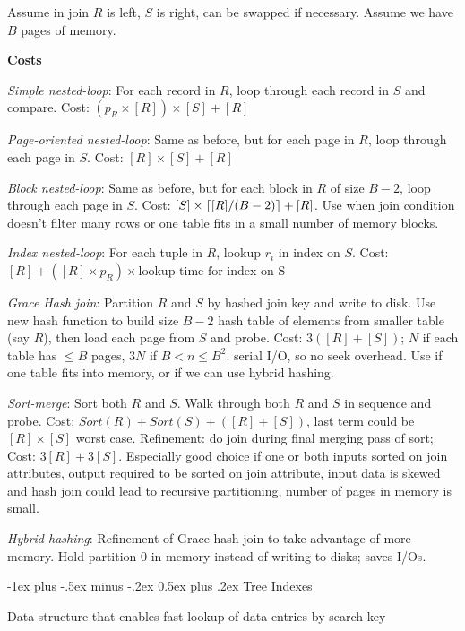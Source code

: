 \documentclass[10pt,landscape]{article}
\makeatletter
\DeclarePairedDelimiter{\ceil}{\lceil}{\rceil}
\renewcommand{\section}{\@startsection{section}{1}{0mm}%
                                {-1ex plus -.5ex minus -.2ex}%
                                {0.5ex plus .2ex}%
                                {\normalfont\large\bfseries}}
\makeatother
\begin{document}
\begin{multicols}{3}
Assume in join $R$ is left, $S$ is right, can be swapped if necessary. Assume we have $B$ pages of memory.

\textbf{Costs}

\textit{Simple nested-loop}: For each record in $R$, loop through each record in $S$ and compare. Cost: $(p_R \times [R]) \times [S] + [R]$

\textit{Page-oriented nested-loop}: Same as before, but for each page in $R$, loop through each page in $S$. Cost: $[R] \times [S] + [R]$

\textit{Block nested-loop}: Same as before, but for each block in $R$ of size $B-2$, loop through each page in $S$. Cost: $[S]\times\ceil*{[R] / (B-2)} + [R]$. Use when join condition doesn't filter many rows or one table fits in a small number of memory blocks.

\textit{Index nested-loop}: For each tuple in $R$, lookup $r_i$ in index on $S$. Cost: $[R] + ([R] \times p_R) \times \text{lookup time for index on S}$

\textit{Grace Hash join}: Partition $R$ and $S$ by hashed join key and write to disk. Use new hash function to build size $B-2$ hash table of elements from smaller table (say $R$), then load each page from $S$ and probe. Cost: $3([R]+[S])$; $N$ if each table has $\le B$ pages, $3N$ if $B < n \le B^2$. serial I/O, so no seek overhead. Use if one table fits into memory, or if we can use hybrid hashing.

\textit{Sort-merge}: Sort both $R$ and $S$. Walk through both $R$ and $S$ in sequence and probe. Cost: $Sort(R) + Sort(S) + ([R] + [S])$, last term could be $[R] \times [S]$ worst case. Refinement: do join during final merging pass of sort; Cost: $3[R] + 3[S]$. Especially good choice if one or both inputs sorted on join attributes, output required to be sorted on join attribute, input data is skewed and hash join could lead to recursive partitioning, number of pages in memory is small.

\textit{Hybrid hashing}: Refinement of Grace hash join to take advantage of more memory. Hold partition 0 in memory instead of writing to disks; saves I/Os.


\section{Tree Indexes}

Data structure that enables fast lookup of data entries by search key


\end{multicols}
\end{document}
